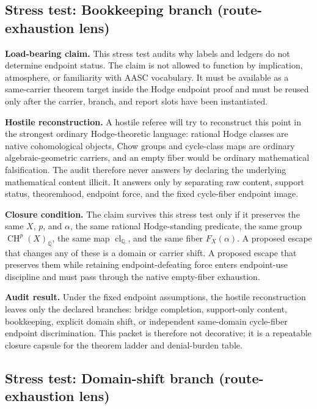 \documentclass[11pt]{article}
\newcommand{\QQ}{\mathbb{Q}}
\newcommand{\CH}{\operatorname{CH}}
\newcommand{\clQ}{\operatorname{cl}_{\QQ}}
\begin{document}
\subsection{Stress test: Bookkeeping branch (route-exhaustion lens)}

\par\noindent\textbf{Load-bearing claim.} This stress test audits why labels and ledgers do not determine endpoint status. The claim is not allowed to function by implication, atmosphere, or familiarity with AASC vocabulary. It must be available as a same-carrier theorem target inside the Hodge endpoint proof and must be reused only after the carrier, branch, and report slots have been instantiated.

\par\noindent\textbf{Hostile reconstruction.} A hostile referee will try to reconstruct this point in the strongest ordinary Hodge-theoretic language: rational Hodge classes are native cohomological objects, Chow groups and cycle-class maps are ordinary algebraic-geometric carriers, and an empty fiber would be ordinary mathematical falsification. The audit therefore never answers by declaring the underlying mathematical content illicit. It answers only by separating raw content, support status, theoremhood, endpoint force, and the fixed cycle-fiber endpoint image.

\par\noindent\textbf{Closure condition.} The claim survives this stress test only if it preserves the same $X$, $p$, and $\alpha$, the same rational Hodge-standing predicate, the same group $\CH^p(X)_\QQ$, the same map $\clQ$, and the same fiber $F_X(\alpha)$. A proposed escape that changes any of these is a domain or carrier shift. A proposed escape that preserves them while retaining endpoint-defeating force enters endpoint-use discipline and must pass through the native empty-fiber exhaustion.

\par\noindent\textbf{Audit result.} Under the fixed endpoint assumptions, the hostile reconstruction leaves only the declared branches: bridge completion, support-only content, bookkeeping, explicit domain shift, or independent same-domain cycle-fiber endpoint discrimination. This packet is therefore not decorative; it is a repeatable closure capsule for the theorem ladder and denial-burden table.


\subsection{Stress test: Domain-shift branch (route-exhaustion lens)}
\end{document}
